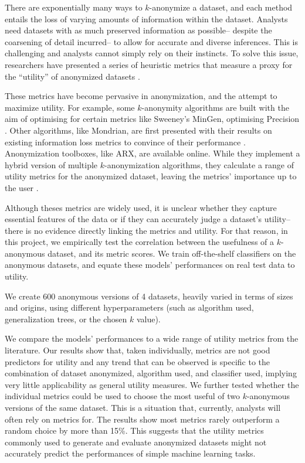 There are exponentially many ways to $k$-anonymize a dataset, and each method entails the loss of varying amounts of information within the dataset. Analysts need datasets with as much preserved information as possible-- despite the coarsening of detail incurred-- to allow for accurate and diverse inferences. This is challenging and analysts cannot simply rely on their instincts. To solve this issue, researchers have presented a series of heuristic metrics that measure a proxy for the 
``utility'' of anonymized datasets \cite{ambiguity_metric, cm_granularity_metric, discern_metric, dse_metric, entropy_measure, hellinger&biv, ilm}.

These metrics have become pervasive in anonymization, and the attempt to maximize utility. For example, some $k$-anonymity algorithms are built with the aim of optimising for certain metrics like Sweeney's MinGen, optimising Precision \cite{kanon_algos}. Other algorithms, like Mondrian, are first presented with their results on existing information loss metrics to convince of their performance \cite{mondrian}. Anonymization toolboxes, like ARX, are available online. While they implement a hybrid version of multiple $k$-anonymization algorithms, they calculate a range of utility metrics for the anonymized dataset, leaving the metrics' importance up to the user \cite{arx}.

Although theses metrics are widely used, it is unclear whether they capture essential features of the data or if they can accurately judge a dataset's utility-- there is no evidence directly linking the metrics and utility. For that reason, in this project, we empirically test the correlation between the usefulness of a $k$-anonymous dataset, and its metric scores. We train off-the-shelf classifiers on the anonymous datasets, and equate these models' performances on real test data to utility. 

We create 600 anonymous versions of 4 datasets, heavily varied in terms of sizes and origins, using different hyperparameters (such as algorithm used, generalization trees, or the chosen $k$ value). 

We compare the models' performances to a wide range of utility metrics from the literature. Our results show that, taken individually, metrics are not good predictors for utility and any trend that can be observed is specific to the combination of dataset anonymized, algorithm used, and classifier used, implying very little applicability as general utility measures. We further tested whether the individual metrics could be used to choose the most useful of two $k$-anonymous versions of the same dataset. This is a situation that, currently, analysts will often rely on metrics for. The results show most metrics rarely outperform a random choice by more than 15\%. This suggests that the utility metrics commonly used to generate and evaluate anonymized datasets might not accurately predict the performances of simple machine learning tasks.


